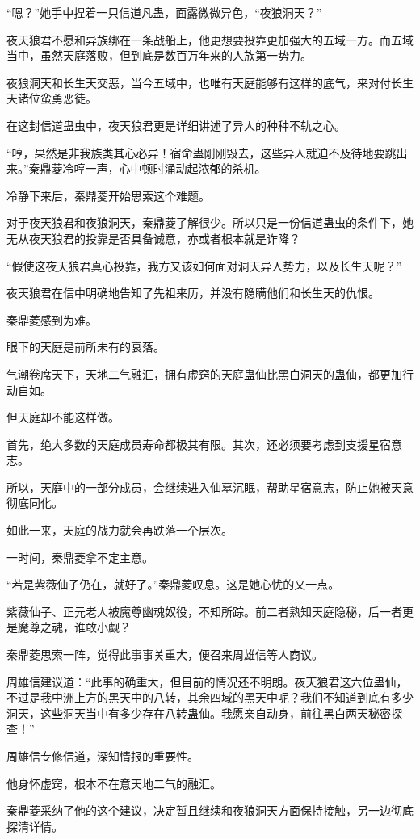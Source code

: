 \begin{this_body}
“嗯？”她手中捏着一只信道凡蛊，面露微微异色，“夜狼洞天？”

夜天狼君不愿和异族绑在一条战船上，他更想要投靠更加强大的五域一方。而五域当中，虽然天庭落败，但到底是数百万年来的人族第一势力。

夜狼洞天和长生天交恶，当今五域中，也唯有天庭能够有这样的底气，来对付长生天诸位蛮勇恶徒。

在这封信道蛊虫中，夜天狼君更是详细讲述了异人的种种不轨之心。

“哼，果然是非我族类其心必异！宿命蛊刚刚毁去，这些异人就迫不及待地要跳出来。”秦鼎菱冷哼一声，心中顿时涌动起浓郁的杀机。

冷静下来后，秦鼎菱开始思索这个难题。

对于夜天狼君和夜狼洞天，秦鼎菱了解很少。所以只是一份信道蛊虫的条件下，她无从夜天狼君的投靠是否具备诚意，亦或者根本就是诈降？

“假使这夜天狼君真心投靠，我方又该如何面对洞天异人势力，以及长生天呢？”

夜天狼君在信中明确地告知了先祖来历，并没有隐瞒他们和长生天的仇恨。

秦鼎菱感到为难。

眼下的天庭是前所未有的衰落。

气潮卷席天下，天地二气融汇，拥有虚窍的天庭蛊仙比黑白洞天的蛊仙，都更加行动自如。

但天庭却不能这样做。

首先，绝大多数的天庭成员寿命都极其有限。其次，还必须要考虑到支援星宿意志。

所以，天庭中的一部分成员，会继续进入仙墓沉眠，帮助星宿意志，防止她被天意彻底同化。

如此一来，天庭的战力就会再跌落一个层次。

一时间，秦鼎菱拿不定主意。

“若是紫薇仙子仍在，就好了。”秦鼎菱叹息。这是她心忧的又一点。

紫薇仙子、正元老人被魔尊幽魂奴役，不知所踪。前二者熟知天庭隐秘，后一者更是魔尊之魂，谁敢小觑？

秦鼎菱思索一阵，觉得此事事关重大，便召来周雄信等人商议。

周雄信建议道：“此事的确重大，但目前的情况还不明朗。夜天狼君这六位蛊仙，不过是我中洲上方的黑天中的八转，其余四域的黑天中呢？我们不知道到底有多少洞天，这些洞天当中有多少存在八转蛊仙。我愿亲自动身，前往黑白两天秘密探查！”

周雄信专修信道，深知情报的重要性。

他身怀虚窍，根本不在意天地二气的融汇。

秦鼎菱采纳了他的这个建议，决定暂且继续和夜狼洞天方面保持接触，另一边彻底探清详情。


\end{this_body}
